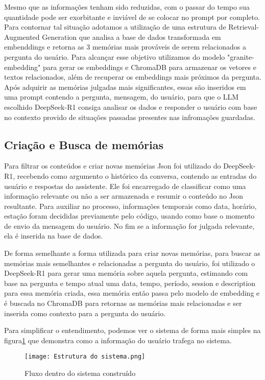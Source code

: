 \documentclass[conference]{IEEEtran}
\begin{document}
Mesmo que as informações tenham sido reduzidas, com o passar do tempo sua quantidade pode ser exorbitante e inviável de se colocar no prompt por completo. Para contornar tal situação adotamos a utilização de uma estrutura de Retrieval-Augmented Generation que analisa a base de dados transformada em embenddings e retorna as 3 memórias mais prováveis de serem relacionados a pergunta do usuário. Para alcançar esse objetivo utilizamos do modelo "granite-embedding" para gerar os embeddings e ChromaDB para armazenar os vetores e textos relacionados, além de recuperar os embeddings mais próximos da pergunta. 
Após adquirir as memórias julgadas mais significantes, essas são inseridos em uma prompt contendo a pergunta, mensagem, do usuário, para que o LLM escolhido DeepSeek-R1 consiga analisar os dados e responder o usuário com base no contexto provido de situações passadas presentes nas infromações guardadas.

\subsection{Criação e Busca de memórias}
Para filtrar os conteúdos e criar novas memórias Json foi utilizado do DeepSeek-R1, recebendo como argumento o histórico da conversa, contendo as entradas do usuário e respostas do assistente. Ele foi encarregado de classificar como uma informação relevante ou não a ser armazenada e resumir o conteúdo no Json resultante. Para auxiliar no processo, informações temporais como data, horário, estação foram decididas previamente pelo código, usando como base o momento de envio da mensagem do usuário. No fim se a informação for julgada relevante, ela é inserida na base de dados.

De forma semelhante a forma utilizada para criar novas memórias, para buscar as memórias mais semelhantes e relacionadas a pergunta do usuário, foi utilizado o DeepSeek-R1 para gerar uma memória sobre aquela pergunta, estimando com base na pergunta e tempo atual uma data, tempo, período, session e description para essa memória criada, essa memória então passa pelo modelo de embedding e é buscada no ChromaDB para retornas as memórias mais relacionadas e ser inserida como contexto para a pergunta do usuário.

Para simplificar o entendimento, podemos ver o sistema de forma mais simples na figura\ref{fig:Estrutura} que demonstra como a informação do usuário trafega no sistema. 

\begin{figure}[h]
    \centering
    \texttt{[image: Estrutura do sistema.png]}
    \caption{Fluxo dentro do sistema construído}
    \label{fig:Estrutura}
\end{figure}
\end{document}
